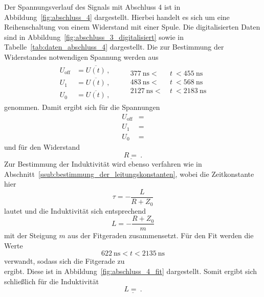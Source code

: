 Der Spannungsverlauf des Signals mit Abschluss 4 ist in
Abbildung~\ref{fig:abschluss_4} dargestellt. Hierbei handelt es sich um eine
Reihenschaltung von einem Widerstand mit einer Spule.
Die digitalisierten Daten sind in Abbildung~\ref{fig:abschluss_3_digitalisiert}
sowie in Tabelle~\ref{tab:daten_abschluss_4} dargestellt.
Die zur Bestimmung der Widerstandes notwendigen Spannung werden aus
\begin{align}
  \begin{aligned}
    U_\text{off} &= \overline{U(t)}\,, \\
    U_1          &= \overline{U(t)}\,, \\
    U_0          &= \overline{U(t)}\,,
  \end{aligned}
  \qquad
  \begin{aligned}
    \SI{377}{\nano\second}  <~&t~< \SI{455}{\nano\second} \\
    \SI{483}{\nano\second}  <~&t~< \SI{568}{\nano\second} \\
    \SI{2127}{\nano\second}  <~&t~< \SI{2183}{\nano\second}
  \end{aligned}
\end{align}
genommen. Damit ergibt sich für die Spannungen
\begin{align}
  U_\text{off} &=  \\
  U_1 &=  \\
  U_0 &= 
\end{align}
und für den Widerstand
\begin{equation}
  \underline{R = }~.
\end{equation}
Zur Bestimmung der Induktivität wird ebenso verfahren wie in
Abschnitt~\ref{ssub:bestimmung_der_leitungskonstanten}, wobei die Zeitkonstante
hier
\begin{equation}
  \tau = -\frac{L}{R + Z_0}
\end{equation}
lautet und die Induktivität sich entsprechend
\begin{equation}
  L = - \frac{R + Z_0}{m}
\end{equation}
mit der Steigung $m$ aus der Fitgeraden zusammensetzt.
Für den Fit werden die Werte
\begin{equation}
  \SI{622}{\nano\second} < t < \SI{2135}{\nano\second}
\end{equation}
verwandt, sodass sich die Fitgerade zu
\begin{equation}
  
\end{equation}
ergibt. Diese ist in Abbildung~\ref{fig:abschluss_4_fit} dargestellt.
Somit ergibt sich schließlich für die Induktivität
\begin{equation}
  \underline{L = ~.}
\end{equation}

